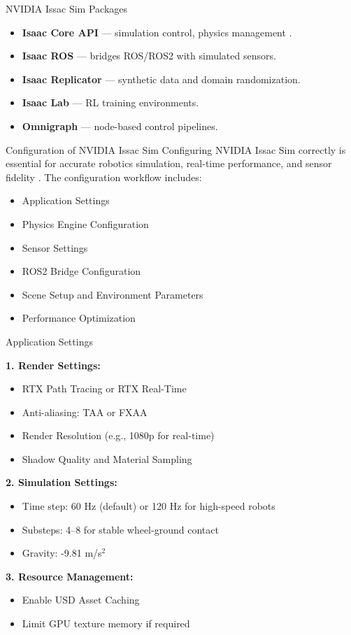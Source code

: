 \begin{frame}{NVIDIA Issac Sim Packages}
\begin{itemize}
  \item \textbf{Isaac Core API} — simulation control, physics management \cite{IsaacCore:2023}.  
  \item \textbf{Isaac ROS} — bridges ROS/ROS2 with simulated sensors.  
  \item \textbf{Isaac Replicator} — synthetic data and domain randomization.  
  \item \textbf{Isaac Lab} — RL training environments.  
  \item \textbf{Omnigraph} — node-based control pipelines.  
\end{itemize}
\end{frame}


\begin{frame}{Configuration of NVIDIA Issac Sim}
Configuring NVIDIA Issac Sim correctly is essential for accurate robotics simulation, 
real-time performance, and sensor fidelity \cite{Config:2024}.  
The configuration workflow includes:  
\begin{itemize}
    \item Application Settings  
    \item Physics Engine Configuration  
    \item Sensor Settings  
    \item ROS2 Bridge Configuration  
    \item Scene Setup and Environment Parameters  
    \item Performance Optimization  
\end{itemize}
\end{frame}

\begin{frame}{Application Settings}

\textbf{1. Render Settings:}
\begin{itemize}
    \item RTX Path Tracing or RTX Real-Time  
    \item Anti-aliasing: TAA or FXAA  
    \item Render Resolution (e.g., 1080p for real-time)  
    \item Shadow Quality and Material Sampling  
\end{itemize}

\textbf{2. Simulation Settings:}
\begin{itemize}
    \item Time step: 60 Hz (default) or 120 Hz for high-speed robots  
    \item Substeps: 4–8 for stable wheel-ground contact  
    \item Gravity: -9.81 m/s\(^2\)  
\end{itemize}

\textbf{3. Resource Management:}
\begin{itemize}
    \item Enable USD Asset Caching  
    \item Limit GPU texture memory if required  
\end{itemize}
\end{frame}

